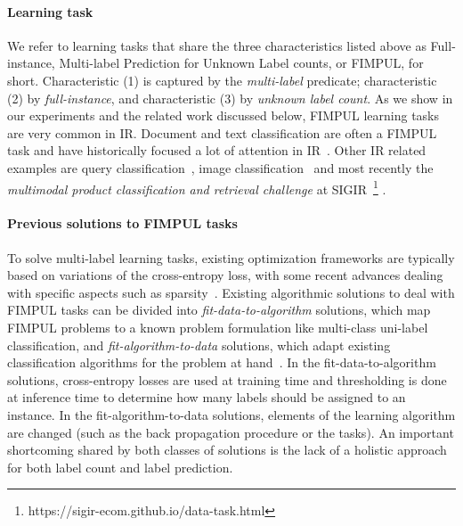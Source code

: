 \paragraph{Learning task}
We refer to learning tasks that share the three characteristics listed above as Full-instance, Multi-label Prediction for Unknown Label counts, or FIMPUL, for short. 
Characteristic (1) is captured by the \emph{multi-label} predicate; characteristic (2) by \emph{full-instance}, and characteristic (3) by \emph{unknown label count}.
As we show in our experiments and the related work discussed below, FIMPUL learning tasks are very common in \ac{IR}. Document and text classification are often a FIMPUL task and have historically focused a lot of attention in \ac{IR}~\cite{IRClassStat, textCategorization, statTextCategorization, documentClassification}. Other \ac{IR} related examples are query classification~\cite{queryClassification}, image classification~\cite{imageClassification} and most recently the \textit{multimodal product classification and retrieval challenge} at SIGIR~\footnote{https://sigir-ecom.github.io/data-task.html} . 

\paragraph{Previous solutions to FIMPUL tasks}
To solve multi-label learning tasks, existing optimization frameworks are typically based on variations of the cross-entropy loss, with some recent advances dealing with specific aspects such as sparsity~\citep[see, e.g.,][]{focalLoss,tencent}. 
Existing algorithmic solutions to deal with FIMPUL tasks can be divided into \emph{fit-data-to-algorithm} solutions, which map FIMPUL problems to a known problem formulation like multi-class uni-label classification, and \emph{fit-algorithm-to-data} solutions, which adapt existing classification algorithms for the problem at hand~\citep{multilabelMethods}. In the fit-data-to-algorithm solutions, cross-entropy losses are used at training time and thresholding is done at inference time to determine how many labels should be assigned to an instance. In the fit-algorithm-to-data solutions, elements of the learning algorithm are changed (such as the back propagation procedure or the tasks). An important shortcoming shared by both classes of solutions is the lack of a holistic approach for both label count and label prediction.

